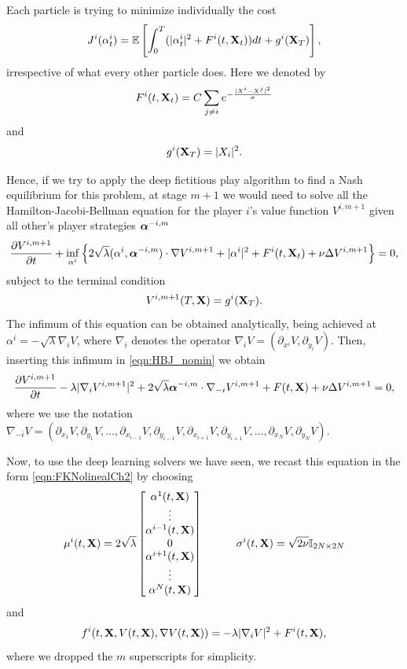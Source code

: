 Each particle is trying to minimize individually the cost 
\begin{equation}
	J^i(\alpha^i_t)=\mathbb{E}\left[\int_{0}^{T}(|\alpha^i_t|^2+F^i(t,\mathbf{X}_t)) dt +g^i(\mathbf{X}_T)\right],
\end{equation}   
irrespective of what every other particle does. Here we denoted by 
\begin{equation}
	F^i(t,\mathbf{X}_t)=C\sum_{j \neq i} e^{-\frac{|X^i-X^j|^2}{\sigma}}
\end{equation}
and 
\begin{equation}
	g^i(\mathbf{X}_T)=|X_i|^2.
\end{equation}

Hence, if we try to apply the deep fictitious play algorithm to find a Nash equilibrium for this problem, at stage $m+1$ we would need to solve all the Hamilton-Jacobi-Bellman equation for the player $i$'s value function $V^{i,m+1}$ given all other's player strategies $\bm{\alpha}^{-i,m}$
\begin{equation}
	\label{eqn:HBJ_nomin}
	\frac{\partial V^{i,m+1}}{\partial t}+\inf_{\alpha^i}\left\{2\sqrt{\lambda}(\alpha^i,\bm{\alpha}^{-i,m})\cdot \nabla V^{i,m+1} +|\alpha^i|^2+F^i(t,\mathbf{X}_t)+\nu \Delta V^{i,m+1}\right\}=0,
\end{equation}
subject to the terminal condition
\begin{equation}
	V^{i,m+1}(T,\mathbf{X})=g^i(\mathbf{X}_T).
\end{equation}
The infimum of this equation can be obtained analytically, being achieved at $\alpha^i=-\sqrt{\lambda}\nabla_i V$, where $\nabla_i$ denotes the operator $\nabla_i V=(\partial_{x^i}V,\partial_{y_i}V)$. Then, inserting this infimum in \eqref{eqn:HBJ_nomin} we obtain
\begin{equation}
	\frac{\partial V^{i,m+1}}{\partial t}-\lambda|\nabla_i V^{i,m+1}|^2+2\sqrt{\lambda}\bm{\alpha}^{-i,m}\cdot \nabla_{-i} V^{i,m+1}+F(t,\mathbf{X})+\nu\Delta V^{i,m+1}=0,
\end{equation}
where we use the notation $\nabla_{-i} V= (\partial_{x_1}V,\partial_{y_1}V,\ldots,\partial_{x_{i-1}}V,\partial_{y_{i-1}}V,\partial_{x_{i+1}}V,\partial_{y_{i+1}}V,\ldots,\partial_{x_N}V,\partial_{y_N}V)$.

Now, to use the deep learning solvers we have seen, we recast this equation in the form \eqref{eqn:FKNolinealCh2} by choosing 
\begin{equation}
	\mu^i(t,\mathbf{X})=2\sqrt{\lambda}\begin{bmatrix}
		\alpha^1(t,\mathbf{X}) \\
		\vdots\\
		\alpha^{i-1}(t,\mathbf{X}) \\
		0\\
		\alpha^{i+1}(t,\mathbf{X})\\
		\vdots   \\
		\alpha^N(t,\mathbf{X})
	\end{bmatrix}
	\quad\quad\quad
	\sigma^i(t,\mathbf{X})=\sqrt{2\nu}\mathbb{I}_{2N\times 2N}
\end{equation}
and
\begin{equation}
	f^i(t,\mathbf{X},V(t,\mathbf{X}),\nabla V(t,\mathbf{X}))=-\lambda|\nabla_i V|^2+F^i(t,\mathbf{X}),
\end{equation}
where we dropped the $m$ superscripts for simplicity.

